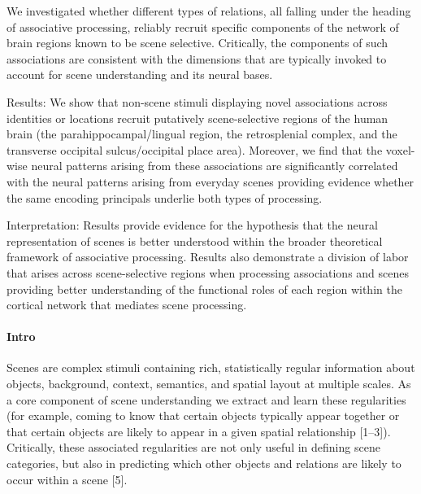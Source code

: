 \documentclass[english]{article}
\begin{document}
%
We investigated whether different types of relations, all falling under the
heading of associative processing, reliably recruit specific components of the
network of brain regions known to be scene
selective\citep{aminoff2015associative}.
%
Critically, the components of such associations are consistent with the
dimensions that are typically invoked to account for scene understanding and its
neural bases\citep{aminoff2015associative}.

Results: We show that non-scene stimuli displaying novel associations across
identities or locations recruit putatively scene-selective regions of the human
brain (the parahippocampal/lingual region, the retrosplenial complex, and the
transverse occipital sulcus/occipital place area)\citep{aminoff2015associative}.
%
Moreover, we find that the voxel-wise neural patterns arising from these
associations are significantly correlated with the neural patterns arising from
everyday scenes providing evidence whether the same encoding principals underlie
both types of processing\citep{aminoff2015associative}.

%
Interpretation: Results provide evidence for the hypothesis that the neural
representation of scenes is better understood within the broader theoretical
framework of associative processing\citep{aminoff2015associative}.
%
Results also demonstrate a division of labor that arises across scene-selective
regions when processing associations and scenes providing better understanding
of the functional roles of each region within the cortical network that mediates
scene processing\citep{aminoff2015associative}.


\paragraph{Intro}

Scenes are complex stimuli containing rich, statistically regular information
about objects, background, context, semantics, and spatial layout at multiple
scales\citep{aminoff2015associative}.
%
As a core component of scene understanding we extract and learn these
regularities (for example, coming to know that certain objects typically appear
together or that certain objects are likely to appear in a given spatial
relationship [1–3])\citep{aminoff2015associative}.
%
Critically, these associated regularities are not only useful in defining scene
categories, but also in predicting which other objects and relations are likely
to occur within a scene [5]\citep{aminoff2015associative}.
\end{document}
